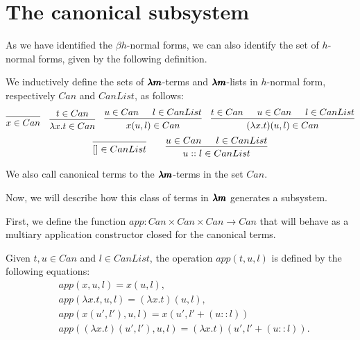 
\section{The canonical subsystem}

As we have identified the $\beta h$-normal forms, we can also identify the set of $h$-normal forms, given by the following definition.

\begin{definition}
  \label{canonical_terms}
  We inductively define the sets of $\pmb{\lambda m}$-terms and $\pmb{\lambda m}$-lists in $h$-normal form, respectively $Can$ and $CanList$, as follows:
  \[
    \begin{prooftree}
      \infer0{ x \in Can } 
    \end{prooftree}
    \quad
    \begin{prooftree}
      \hypo{ t \in Can }
      \infer1{ \lambda x . t \in Can } 
    \end{prooftree}
    \quad
    \begin{prooftree}
      \hypo{ u \in Can }            
      \hypo{ l \in CanList }
      \infer2{ x(u, l) \in Can }
    \end{prooftree}
    \quad
    \begin{prooftree}
      \hypo{ t \in Can } 
      \hypo{ u \in Can }            
      \hypo{ l \in CanList }
      \infer3{ (\lambda x. t)(u, l) \in Can }
    \end{prooftree}
  \]
  \[
    \begin{prooftree}
      \infer0{ [] \in CanList } 
    \end{prooftree}
    \qquad
    \begin{prooftree}
      \hypo{ u \in Can }            
      \hypo{ l \in CanList }
      \infer2{ u::l \in CanList }
    \end{prooftree}
  \]

  We also call canonical terms to the $\pmb{\lambda m}$-terms in the set $Can$.
\end{definition}

Now, we will describe how this class of terms in $\pmb{\lambda m}$ generates a subsystem.

First, we define the function $app : Can \times Can \times Can \to Can$ that will behave as a multiary application constructor closed for the canonical terms.

\begin{definition}
  Given $t, u \in Can$ and $l \in CanList$, the operation $app(t, u, l)$ is defined by the following equations:
  \begin{align*}
    & app(x, u, l) = x(u, l), \\
    & app(\lambda x. t, u, l) = (\lambda x. t)(u, l), \\ 
    & app(x(u', l'), u, l) = x(u', l' + (u::l)) \\
    & app((\lambda x. t)(u', l'), u, l) = (\lambda x. t)(u', l'+(u::l)).
  \end{align*}  
\end{definition}

